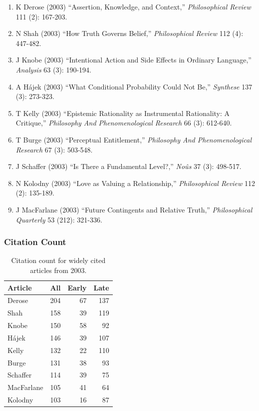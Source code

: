 \documentclass[
  10pt,
  letterpaper,
  DIV=11,
  numbers=noendperiod,
  twoside]{scrartcl}
\providecommand{\tightlist}{%
  \setlength{\itemsep}{0pt}\setlength{\parskip}{0pt}}\usepackage{longtable,booktabs,array}
\begin{document}
\begin{enumerate}
\def\labelenumi{\arabic{enumi}.}
\tightlist
\item
  K Derose (2003) ``Assertion, Knowledge, and Context,''
  \emph{Philosophical Review} 111 (2): 167-203.
\item
  N Shah (2003) ``How Truth Governs Belief,'' \emph{Philosophical
  Review} 112 (4): 447-482.
\item
  J Knobe (2003) ``Intentional Action and Side Effects in Ordinary
  Language,'' \emph{Analysis} 63 (3): 190-194.
\item
  A Hájek (2003) ``What Conditional Probability Could Not Be,''
  \emph{Synthese} 137 (3): 273-323.
\item
  T Kelly (2003) ``Epistemic Rationality as Instrumental Rationality: A
  Critique,'' \emph{Philosophy And Phenomenological Research} 66 (3):
  612-640.
\item
  T Burge (2003) ``Perceptual Entitlement,'' \emph{Philosophy And
  Phenomenological Research} 67 (3): 503-548.
\item
  J Schaffer (2003) ``Is There a Fundamental Level?,'' \emph{Noûs} 37
  (3): 498-517.
\item
  N Kolodny (2003) ``Love as Valuing a Relationship,''
  \emph{Philosophical Review} 112 (2): 135-189.
\item
  J MacFarlane (2003) ``Future Contingents and Relative Truth,''
  \emph{Philosophical Quarterly} 53 (212): 321-336.
\end{enumerate}

\subsubsection*{Citation Count}\label{sec-count-2003}

\begin{longtable}[]{@{}lrrr@{}}

\caption{\label{tbl-citation-count-2003}Citation count for widely cited
articles from 2003.}

\tabularnewline

\toprule\noalign{}
Article & All & Early & Late \\
\midrule\noalign{}
\endhead
\bottomrule\noalign{}
\endlastfoot
Derose & 204 & 67 & 137 \\
Shah & 158 & 39 & 119 \\
Knobe & 150 & 58 & 92 \\
Hájek & 146 & 39 & 107 \\
Kelly & 132 & 22 & 110 \\
Burge & 131 & 38 & 93 \\
Schaffer & 114 & 39 & 75 \\
MacFarlane & 105 & 41 & 64 \\
Kolodny & 103 & 16 & 87 \\

\end{longtable}
\end{document}
